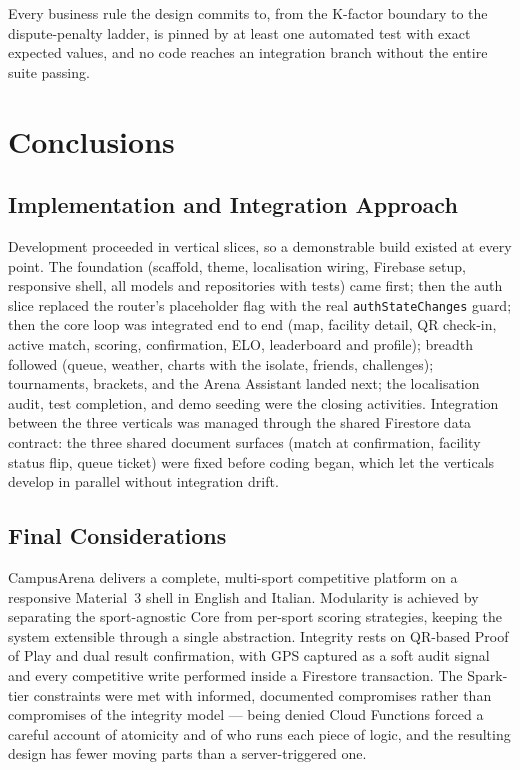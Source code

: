 \documentclass{configurations/polimi3i_thesis}
\renewcommand{\_}{\textunderscore\allowbreak}
\begin{document}
Every business rule the design commits to, from the K-factor boundary to the dispute-penalty ladder, is pinned by at least one automated test with exact expected values, and no code reaches an integration branch without the entire suite passing.


\chapter{Conclusions}
\label{ch:conclusions}

\section{Implementation and Integration Approach}
Development proceeded in vertical slices, so a demonstrable build existed at every point. The foundation (scaffold, theme, localisation wiring, Firebase setup, responsive shell, all models and repositories with tests) came first; then the auth slice replaced the router's placeholder flag with the real \texttt{authStateChanges} guard; then the core loop was integrated end to end (map, facility detail, QR check-in, active match, scoring, confirmation, ELO, leaderboard and profile); breadth followed (queue, weather, charts with the isolate, friends, challenges); tournaments, brackets, and the Arena Assistant landed next; the localisation audit, test completion, and demo seeding were the closing activities. Integration between the three verticals was managed through the shared Firestore data contract: the three shared document surfaces (match at confirmation, facility status flip, queue ticket) were fixed before coding began, which let the verticals develop in parallel without integration drift.

\section{Final Considerations}
CampusArena delivers a complete, multi-sport competitive platform on a responsive Material~3 shell in English and Italian. Modularity is achieved by separating the sport-agnostic Core from per-sport scoring strategies, keeping the system extensible through a single abstraction. Integrity rests on QR-based Proof of Play and dual result confirmation, with GPS captured as a soft audit signal and every competitive write performed inside a Firestore transaction. The Spark-tier constraints were met with informed, documented compromises rather than compromises of the integrity model — being denied Cloud Functions forced a careful account of atomicity and of who runs each piece of logic, and the resulting design has fewer moving parts than a server-triggered one.
\end{document}
